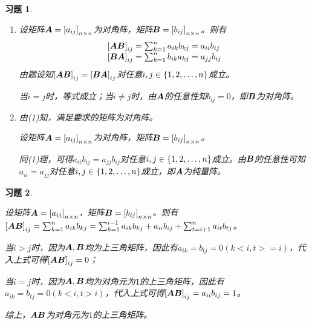 \documentclass{ctexart}
\newtheorem{problem}{习题}[section]
\begin{document}
\begin{problem}\

\begin{enumerate}
    \item
          {
          设矩阵\(\boldsymbol{A}=\left[ a_{ij} \right]_{n\times n}\)为对角阵，矩阵\(\boldsymbol{B}=\left[ b_{ij} \right]_{n\times n}\)。则有
          \begin{equation*}
              \begin{array}{lll}
                  \left[ \boldsymbol{A}\boldsymbol{B} \right]_{ij}=\sum_{k=1}^na_{ik}b_{kj}=a_{ii}b_{ij} \\
                  \left[ \boldsymbol{B}\boldsymbol{A} \right]_{ij}=\sum_{k=1}^nb_{ik}a_{kj}=a_{jj}b_{ij}
              \end{array}
          \end{equation*}
          由题设知\(\left[ \boldsymbol{A}\boldsymbol{B} \right]_{ij}=\left[ \boldsymbol{B}\boldsymbol{A} \right]_{ij}\)对任意\(i,j\in\left\{1,2,\dots,n \right\}\)成立。

          当\(i=j\)时，等式成立；当\(i\neq j\)时，由\(\boldsymbol{A}\)的任意性知\(b_{ij}=0\)，即\(\boldsymbol{B}\)为对角阵。
          }
    \item
          {
          由(1)知，满足要求的矩阵为对角阵。

          设矩阵\(\boldsymbol{A}=\left[ a_{ij} \right]_{n\times n}\)为对角阵，矩阵\(\boldsymbol{B}=\left[ b_{ij} \right]_{n\times n}\)。

          同(1)理，可得\(a_{ii}b_{ij}=a_{jj}b_{ij}\)对任意\(i,j\in\left\{1,2,\dots,n \right\}\)成立。由\(\boldsymbol{B}\)的任意性可知\(a_{ii}=a_{jj}\)对任意\(i,j\in\left\{1,2,\dots,n \right\}\)成立，即\(\boldsymbol{A}\)为纯量阵。
          }
\end{enumerate}

\end{problem}

\begin{problem}\

设矩阵\(\boldsymbol{A}=\left[ a_{ij} \right]_{n\times n}\)，矩阵\(\boldsymbol{B}=\left[ b_{ij} \right]_{n\times n}\)。则有\(\left[ \boldsymbol{A}\boldsymbol{B} \right]_{ij}=\sum_{k=1}^na_{ik}b_{kj}=\sum_{k=1}^{i-1}a_{ik}b_{kj}+a_{ii}b_{ij}+\sum_{t=i+1}^na_{it}b_{tj}\)。

当\(i>j\)时，因为\(\boldsymbol{A},\boldsymbol{B}\)均为上三角矩阵，因此有\(a_{ik}=b_{tj}=0(k<i,t>=i)\)，代入上式可得\(\left[ \boldsymbol{A}\boldsymbol{B} \right]_{ij}=0\)；

当\(i=j\)时，因为\(\boldsymbol{A},\boldsymbol{B}\)均为对角元为\(1\)的上三角矩阵，因此有\(a_{ik}=b_{tj}=0(k<i,t>i)\)，代入上式可得\(\left[ \boldsymbol{A}\boldsymbol{B} \right]_{ij}=a_{ii}b_{ij}=1\)。

综上，\(\boldsymbol{A}\boldsymbol{B}\)为对角元为\(1\)的上三角矩阵。

\end{problem}
\end{document}
